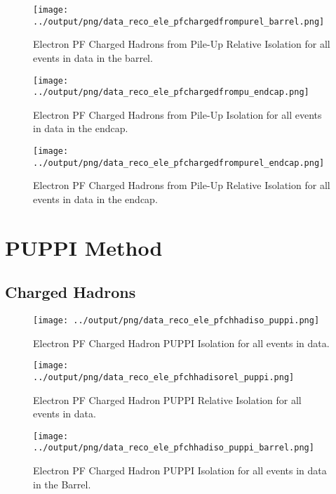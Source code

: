 \documentclass[11pt]{book}
\begin{document}
\begin{figure}[htb]
\centering
\texttt{[image: ../output/png/data\_reco\_ele\_pfchargedfrompurel\_barrel.png]}
\caption{Electron PF Charged Hadrons from Pile-Up Relative Isolation for all events in data in the barrel.}
\label{fig:data_ele_pfchargedfrompurel_barrel}
\end{figure}

\begin{figure}[htb]
\centering
\texttt{[image: ../output/png/data\_reco\_ele\_pfchargedfrompu\_endcap.png]}
\caption{Electron PF Charged Hadrons from Pile-Up Isolation for all events in data in the endcap.}
\label{fig:data_ele_pfchargedfrompu_endcap}
\end{figure}


\begin{figure}[htb]
\centering
\texttt{[image: ../output/png/data\_reco\_ele\_pfchargedfrompurel\_endcap.png]}
\caption{Electron PF Charged Hadrons from Pile-Up Relative Isolation for all events in data in the endcap.}
\label{fig:data_ele_pfchargedfrompurel_endcap}
\end{figure}
\clearpage

\section{PUPPI Method}
\subsection{Charged Hadrons}
\begin{figure}[htb]
\centering
\texttt{[image: ../output/png/data\_reco\_ele\_pfchhadiso\_puppi.png]}
\caption{Electron PF Charged Hadron PUPPI Isolation for all events in data.}
\label{fig:data_ele_pfchhadiso_puppi}
\end{figure}

\begin{figure}[htb]
\centering
\texttt{[image: ../output/png/data\_reco\_ele\_pfchhadisorel\_puppi.png]}
\caption{Electron PF Charged Hadron PUPPI Relative Isolation for all events in data.}
\label{fig:data_ele_pfchhadisorel_puppi}
\end{figure}

\begin{figure}[htb]
\centering
\texttt{[image: ../output/png/data\_reco\_ele\_pfchhadiso\_puppi\_barrel.png]}
\caption{Electron PF Charged Hadron PUPPI Isolation for all events in data in the Barrel.}
\label{fig:data_ele_pfchhadiso_puppi_barrel}
\end{figure}
\end{document}
